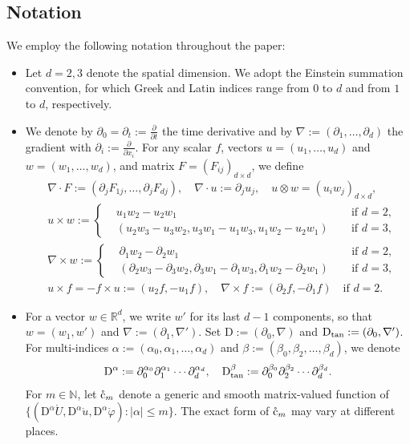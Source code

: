 \documentclass[twoside,11pt]{article}
\numberwithin{equation}{section}
\def\p{\partial}
\begin{document}
	\subsection{Notation} \label{sec:nontation}
	We employ the following notation throughout the paper:
\begin{itemize}
		\item
Let $d=2,3$ denote the spatial dimension.
We adopt the Einstein summation convention, for which Greek and Latin indices range from $0$ to $d$ and from $1$ to $d$, respectively.	

\item
We denote by $\p_0=\p_t:=\frac{\p}{\p t}$ the time derivative and by $\nabla:=(\p_1,\ldots,\p_d)$ the gradient with $\p_i:=\frac{\p}{\p x_i}$.
For any scalar $f$,
vectors $u=(u_1,\ldots,u_d)$ and
$w=(w_1,\ldots,w_d)$, and matrix $F=(F_{ij})_{d\times d}$,
we define %
\begin{align*}
	&\nabla\cdot F:=  (\p_j F_{1j},\ldots,\p_j F_{dj}),
	\quad \nabla\cdot u:= \p_j u_{j},
	\quad u\otimes w=(u_i w_j)_{d\times d},
	\\[0.5mm]
	&u\times w:=
	\left\{
	\begin{aligned}
		&u_1 w_2 -u_2 w_1\ \quad & \textrm{if }d=2,\\
		&(u_2 w_3 -u_3 w_2,u_3 w_1 -u_1 w_3,u_1 w_2 -u_2 w_1)\ \quad & \textrm{if }d=3,
	\end{aligned}
	\right.\\[0.5mm]
	&\nabla\times w:=
	\left\{
	\begin{aligned}
		&\p_1 w_2 -\p_2 w_1\ \quad & \textrm{if }d=2,\\
		&(\p_2 w_3 -\p_3 w_2,\p_3 w_1 -\p_1 w_3,\p_1 w_2 -\p_2 w_1) \ \quad & \textrm{if }d=3,
	\end{aligned}
	\right.\\[0.5mm]
	&u\times f = -f\times u:=(u_2 f, -u_1 f),
	\quad
	\nabla\times f :=(\p_2f , -\p_1 f)
	\quad \textrm{if }d=2.
\end{align*}	


		\item
For a vector $w\in\mathbb{R}^d$, we write $w'$ for its last $d-1$ components, so that $w=(w_1,w')$  and $\nabla:=(\p_1,\nabla')$.	
Set $\mathrm{D}:=(\p_0,\nabla)$ and $\mathrm{D}_{\rm tan}:=(\p_0, \nabla')$.
For multi-indices $\alpha:=(\alpha_0,\alpha_1,\ldots,\alpha_{d})$ and $\beta:=(\beta_0, \beta_{2}, \ldots,\beta_{d})$, we denote
\begin{align*}
	\mathrm{D}^{\alpha}:=\p_0^{\alpha_0}\p_1^{\alpha_1} \cdots\p_d^{\alpha_d} ,\quad
	\mathrm{D}_{\rm tan}^{\beta}:=\p_0^{\beta_0}\p_2^{\beta_2}\cdots \p_d^{\beta_d}.
\end{align*}
	For $m\in \mathbb{N}$, let $\mathring{\rm c}_m$ denote
a generic and smooth matrix-valued function of
$\{(\mathrm{D}^{\alpha} \mathring{U},\mathrm{D}^{\alpha} \mathring{{u}},\mathrm{D}^{\alpha}\mathring{\varphi}): |\alpha|\leq m\}$.
The exact form of $\mathring{\rm c}_m$ may vary at different places.		



\end{itemize}
\end{document}
